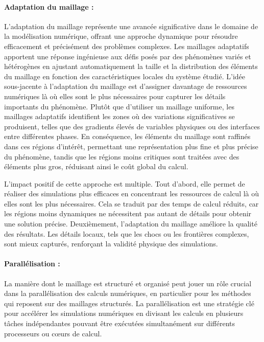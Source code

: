 \paragraph{Adaptation du maillage :}

L'adaptation du maillage représente une avancée significative dans le domaine de la modélisation numérique, offrant une approche dynamique pour résoudre efficacement et précisément des problèmes complexes. Les maillages adaptatifs apportent une réponse ingénieuse aux défis posés par des phénomènes variés et hétérogènes en ajustant automatiquement la taille et la distribution des éléments du maillage en fonction des caractéristiques locales du système étudié. L'idée sous-jacente à l'adaptation du maillage est d'assigner davantage de ressources numériques là où elles sont le plus nécessaires pour capturer les détails importants du phénomène. Plutôt que d'utiliser un maillage uniforme, les maillages adaptatifs identifient les zones où des variations significatives se produisent, telles que des gradients élevés de variables physiques ou des interfaces entre différentes phases. En conséquence, les éléments du maillage sont raffinés dans ces régions d'intérêt, permettant une représentation plus fine et plus précise du phénomène, tandis que les régions moins critiques sont traitées avec des éléments plus gros, réduisant ainsi le coût global du calcul.

L'impact positif de cette approche est multiple. Tout d'abord, elle permet de réaliser des simulations plus efficaces en concentrant les ressources de calcul là où elles sont les plus nécessaires. Cela se traduit par des temps de calcul réduits, car les régions moins dynamiques ne nécessitent pas autant de détails pour obtenir une solution précise. Deuxièmement, l'adaptation du maillage améliore la qualité des résultats. Les détails locaux, tels que les chocs ou les frontières complexes, sont mieux capturés, renforçant la validité physique des simulations.

\paragraph{Parallélisation :}

La manière dont le maillage est structuré et organisé peut jouer un rôle crucial dans la parallélisation des calculs numériques, en particulier pour les méthodes qui reposent sur des maillages structurés. La parallélisation est une stratégie clé pour accélérer les simulations numériques en divisant les calculs en plusieurs tâches indépendantes pouvant être exécutées simultanément sur différents processeurs ou cœurs de calcul.

